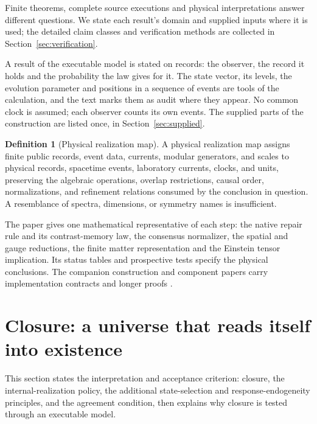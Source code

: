\documentclass[11pt]{article}
\theoremstyle{definition}
\newtheorem{definition}[theorem]{Definition}
\theoremstyle{remark}
\begin{document}
Finite theorems, complete source executions and physical interpretations
answer different questions. We state each result's domain and supplied
inputs where it is used; the detailed claim classes and verification
methods are collected in Section~\ref{sec:verification}.

A result of the executable model is stated on records: the observer, the
record it holds and the probability the law gives for it. The state
vector, its levels, the evolution parameter and positions in a sequence of
events are tools of the calculation, and the text marks them as audit
where they appear. No common clock is assumed; each observer counts its
own events. The supplied parts of the construction are listed once, in
Section~\ref{sec:supplied}.

\begin{definition}[Physical realization map]
\label{def:physical-realization}
A physical realization map assigns finite public records, event data,
currents, modular generators, and scales to physical records, spacetime
events, laboratory currents, clocks, and units, preserving the algebraic
operations, overlap restrictions, causal order, normalizations, and
refinement relations consumed by the conclusion in question. A resemblance
of spectra, dimensions, or symmetry names is insufficient.
\end{definition}

The paper gives one mathematical representative of each step: the native
repair rule and its contrast-memory law, the consensus normalizer, the
spatial and gauge reductions,
the finite matter representation and the Einstein tensor implication. Its
status tables and prospective tests specify the physical conclusions.
The companion construction and component papers carry implementation
contracts and longer proofs
\cite{ophspine,ophrepo,ophnormalforms,opheventalgebra,ophconsensus,ophobservers,ophGauge,ophEinstein,ophMicrophysics,ophdesitter,ophyangmills,ophsim}.

\section{Closure: a universe that reads itself into existence}
\label{sec:strange-loop}

This section states the interpretation and acceptance criterion: closure, the internal-realization policy, the additional
state-selection and response-endogeneity principles, and the agreement
condition, then explains why closure is tested through an executable model.
\end{document}
